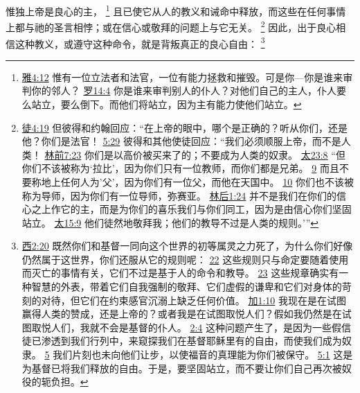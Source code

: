 \documentclass[12pt, a4paper, oneside]{ctexart}
\newcounter{parnum}[section]
\newcommand{\N}{%
   \noindent\refstepcounter{parnum}%
    \makebox[\parindent][l]{\textbf{\arabic{parnum}.}}}
\begin{document}
\N 惟独上帝是良心的主，
	\footnote {
		\href{https://biblehub.com/james/4-12.htm}{雅4:12} 惟有一位立法者和法官，一位有能力拯救和摧毁。可是你---你是谁来审判你的邻人？
		\href{https://biblehub.com/romans/14-4.htm}{罗14:4} 你是谁来审判别人的仆人？对他们自己的主人，仆人要么站立，要么倒下。而他们将站立，因为主有能力使他们站立。
	}
	且已使它从人的教义和诫命中释放，而这些在任何事情上都与祂的圣言相悖；或在信心或敬拜的问题上与它无关。
	\footnote {
		\href{https://biblehub.com/acts/4-19.htm}{徒4:19} 但彼得和约翰回应：“在上帝的眼中，哪个是正确的？听从你们，还是他？你们是法官！
		\href{https://biblehub.com/acts/5-29.htm}{5:29} 彼得和其他使徒回应：“我们必须顺服上帝，而不是人类！ \href{https://biblehub.com/1_corinthians/7-23.htm}{林前7:23} 你们是以高价被买来了的；不要成为人类的奴隶。
		\href{https://biblehub.com/matthew/23-8.htm}{太23:8} “但你们不该被称为‘拉比’，因为你们只有一位教师，而你们都是兄弟。
		\href{https://biblehub.com/matthew/23-9.htm}{9} 而且不要称地上任何人为'父'，因为你们有一位父，而他在天国中。
		\href{https://biblehub.com/matthew/23-10.htm}{10} 你们也不该被称为导师，因为你们有一位导师，弥赛亚。
		\href{https://biblehub.com/2_corinthians/1-24.htm}{林后1:24} 并不是我们在你们的信心之上作它的主，而是为你们的喜乐我们与你们同工，因为是由信心你们坚固站立。
		\href{https://biblehub.com/matthew/15-9.htm}{太15:9} 他们徒然地敬拜我；他们的教导不过是人类的规则。’”
	}
	因此，出于良心相信这种教义，或遵守这种命令，就是背叛真正的良心自由：
	\footnote {
		\href{https://biblehub.com/colossians/2-20.htm}{西2:20} 既然你们和基督一同向这个世界的初等属灵之力死了，为什么你们好像仍然属于这世界，你们还服从它的规则呢：
		\href{https://biblehub.com/colossians/2-22.htm}{22} 这些规则只与命定要随着使用而灭亡的事情有关，它们不过是基于人的命令和教导。
		\href{https://biblehub.com/colossians/2-23.htm}{23} 这些规章确实有一种智慧的外表，带着它们自我强制的敬拜、它们虚假的谦卑和它们对身体的苛刻的对待，但它们在约束感官沉溺上缺乏任何价值。
		\href{https://biblehub.com/galatians/1-10.htm}{加1:10} 我现在是在试图赢得人类的赞成，还是上帝的？或者我是在试图取悦人们？假如我仍然是在试图取悦人们，我就不会是基督的仆人。
		\href{https://biblehub.com/galatians/2-4.htm}{2:4} 这种问题产生了，是因为一些假信徒已渗透到我们行列中，来窥探我们在基督耶稣里有的自由，而使我们成为奴隶。
		\href{https://biblehub.com/galatians/2-5.htm}{5} 我们片刻也未向他们让步，以使福音的真理能为你们被保守。
		\href{https://biblehub.com/galatians/5-1.htm}{5:1} 这是为基督已将我们释放的自由。于是，要坚固站立，而不要让你们自己再次被奴役的轭负担。
	}
\end{document}

